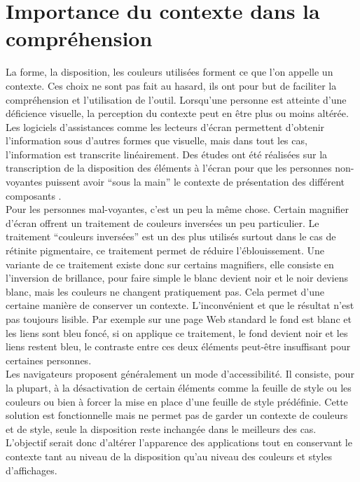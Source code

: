\documentclass[french,a4paper]{report}
\begin{document}
{\section{Importance du contexte dans la compréhension}
\label{sctcontexte}
La forme, la disposition, les couleurs utilisées forment ce que l'on appelle un contexte.
Ces choix ne sont pas fait au hasard, ils ont pour but de faciliter la compréhension et
l'utilisation de l'outil. Lorsqu'une personne est atteinte d'une déficience visuelle, la
perception du contexte peut en être plus ou moins altérée. Les logiciels d'assistances comme
les lecteurs d'écran permettent d'obtenir l'information sous d'autres formes que visuelle, mais
dans tout les cas, l'information est transcrite linéairement. Des études ont été réalisées sur
la transcription de la disposition des éléments à l'écran pour que les personnes non-voyantes
puissent avoir \enquote{sous la main} le contexte de présentation des différent composants
\cite{theseyoussef}.\\
Pour les personnes mal-voyantes, c'est un peu la même chose. Certain magnifier d'écran
offrent un traitement de couleurs inversées un peu particulier. Le traitement
\enquote{couleurs inversées}
est un des plus utilisés surtout dans le cas de rétinite pigmentaire, ce traitement permet de
réduire l'éblouissement. Une variante de ce traitement existe donc sur certains magnifiers,
elle consiste en l'inversion de brillance, pour faire simple le blanc devient noir et le noir
deviens blanc, mais les couleurs ne changent pratiquement pas. Cela permet d'une certaine manière
de conserver un contexte. L'inconvénient et que le résultat n'est pas toujours lisible. Par
exemple sur une page Web standard le fond est blanc et les liens sont bleu foncé, si on applique
ce traitement, le fond devient noir et les liens restent bleu, le contraste entre ces deux
éléments peut-être insuffisant pour certaines personnes.\\
Les navigateurs proposent généralement un mode d'accessibilité. Il consiste,
pour la plupart, à la désactivation de certain éléments comme la feuille de
style ou les couleurs ou bien à forcer la mise en place d'une feuille de style
prédéfinie. Cette solution est fonctionnelle mais ne permet pas de garder un
contexte de couleurs et de style, seule la disposition reste inchangée dans le
meilleurs des cas.\\
L'objectif serait donc d'altérer l'apparence des applications tout en conservant le contexte tant
au niveau de la disposition qu'au niveau des couleurs et styles d'affichages.
}
\end{document}
